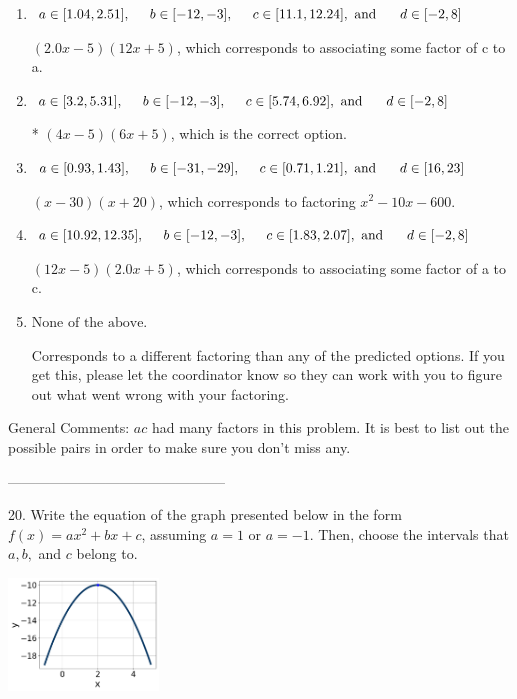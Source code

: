 \documentclass{article}[14pt]
\begin{document}
\begin{enumerate}[label=\Alph*.] 
\item $ a \in [1.04, 2.51], \hspace*{5mm} b \in [-12, -3], \hspace*{5mm} c \in [11.1, 12.24], \text{ and } \hspace*{5mm} d \in [-2, 8] $ 

  $(2.0x -5)(12x + 5)$, which corresponds to associating some factor of c to a. 
\item $ a \in [3.2, 5.31], \hspace*{5mm} b \in [-12, -3], \hspace*{5mm} c \in [5.74, 6.92], \text{ and } \hspace*{5mm} d \in [-2, 8] $ 

 * $(4x -5)(6x + 5)$, which is the correct option. 
\item $ a \in [0.93, 1.43], \hspace*{5mm} b \in [-31, -29], \hspace*{5mm} c \in [0.71, 1.21], \text{ and } \hspace*{5mm} d \in [16, 23] $ 

  $(x -30)(x + 20)$, which corresponds to factoring $x^{2} -10 x -600$. 
\item $ a \in [10.92, 12.35], \hspace*{5mm} b \in [-12, -3], \hspace*{5mm} c \in [1.83, 2.07], \text{ and } \hspace*{5mm} d \in [-2, 8] $ 

  $(12x -5)(2.0x + 5)$, which corresponds to associating some factor of a to c. 
\item $ \text{None of the above.} $ 

  Corresponds to a different factoring than any of the predicted options. If you get this, please let the coordinator know so they can work with you to figure out what went wrong with your factoring. 
\end{enumerate} 
 
General Comments: $ac$ had many factors in this problem. It is best to list out the possible pairs in order to make sure you don't miss any.

-----------------------------------------------

20. Write the equation of the graph presented below in the form $f(x)=ax^2+bx+c$, assuming  $a=1$ or $a=-1$. Then, choose the intervals that $a, b,$ and $c$ belong to.
\begin{center} \includegraphics[width=0.3\textwidth]{../Figures/quadraticGraphToEquationA.png} \end{center} 
\end{document}
